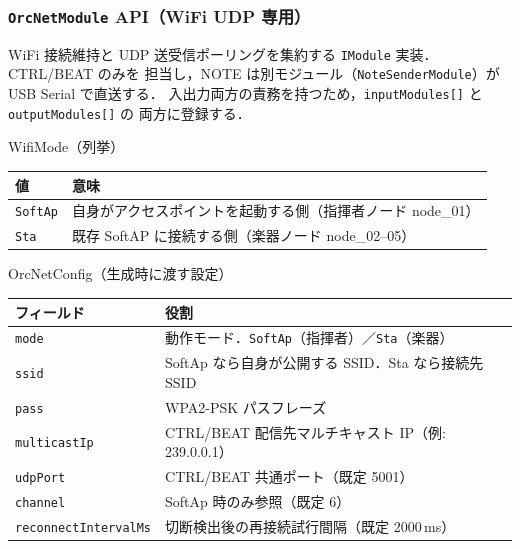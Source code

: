 \documentclass[lualatex,book,paper=a4paper,jafontsize=11.5pt,jafontscale=1.05]{jlreq}
\begin{document}
\subsubsection{\texttt{OrcNetModule} API（WiFi UDP 専用）}

WiFi 接続維持と UDP 送受信ポーリングを集約する \texttt{IModule} 実装．CTRL/BEAT のみを
担当し，NOTE は別モジュール（\texttt{NoteSenderModule}）が USB Serial で直送する．
入出力両方の責務を持つため，\texttt{inputModules[]} と \texttt{outputModules[]} の
両方に登録する．

\begin{apibox}{WifiMode（列挙）}
\begin{tabular}{l p{}}
\toprule
\textbf{値} & \textbf{意味} \\
\midrule
\texttt{SoftAp} & 自身がアクセスポイントを起動する側（指揮者ノード node\_01） \\
\texttt{Sta}    & 既存 SoftAP に接続する側（楽器ノード node\_02--05） \\
\bottomrule
\end{tabular}
\end{apibox}

\begin{apibox}{OrcNetConfig（生成時に渡す設定）}
\begin{tabular}{l p{}}
\toprule
\textbf{フィールド} & \textbf{役割} \\
\midrule
\texttt{mode}                & 動作モード．\texttt{SoftAp}（指揮者）／\texttt{Sta}（楽器） \\
\texttt{ssid}                & SoftAp なら自身が公開する SSID．Sta なら接続先 SSID \\
\texttt{pass}                & WPA2-PSK パスフレーズ \\
\texttt{multicastIp}         & CTRL/BEAT 配信先マルチキャスト IP（例: 239.0.0.1） \\
\texttt{udpPort}             & CTRL/BEAT 共通ポート（既定 5001） \\
\texttt{channel}             & SoftAp 時のみ参照（既定 6） \\
\texttt{reconnectIntervalMs} & 切断検出後の再接続試行間隔（既定 2000\,ms） \\
\bottomrule
\end{tabular}
\end{apibox}
\end{document}
